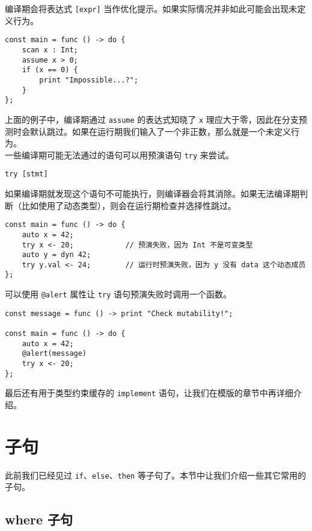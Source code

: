 编译期会将表达式 \lstinline![expr]! 当作优化提示。如果实际情况并非如此可能会出现未定义行为。

\begin{lstlisting}
const main = func () -> do {
    scan x : Int;
    assume x > 0;
    if (x == 0) {
        print "Impossible...?";
    }
};
\end{lstlisting}

上面的例子中，编译期通过 \lstinline!assume! 的表达式知晓了 \lstinline!x! 理应大于零，因此在分支预测时会默认跳过。如果在运行期我们输入了一个非正数，那么就是一个未定义行为。 \\

一些编译期可能无法通过的语句可以用预演语句 \lstinline!try! 来尝试。

\begin{grammar} \label{grm:try-statement}
    \lstinline!try [stmt]!
\end{grammar}

如果编译期就发现这个语句不可能执行，则编译器会将其消除。如果无法编译期判断（比如使用了动态类型），则会在运行期检查并选择性跳过。

\begin{lstlisting}
const main = func () -> do {
    auto x = 42;
    try x <- 20;            // 预演失败，因为 Int 不是可变类型
    auto y = dyn 42;
    try y.val <- 24;		// 运行时预演失败，因为 y 没有 data 这个动态成员
};
\end{lstlisting}

可以使用 \lstinline!@alert! 属性让 \lstinline!try! 语句预演失败时调用一个函数。

\begin{lstlisting}
const message = func () -> print "Check mutability!";

const main = func () -> do {
    auto x = 42;
    @alert(message)
    try x <- 20;
};
\end{lstlisting}

最后还有用于类型约束缓存的 \lstinline!implement! 语句，让我们在模版的章节中再详细介绍。

\section{子句}

此前我们已经见过 \lstinline!if!、\lstinline!else!、\lstinline!then! 等子句了。本节中让我们介绍一些其它常用的子句。

\subsection{where 子句}

